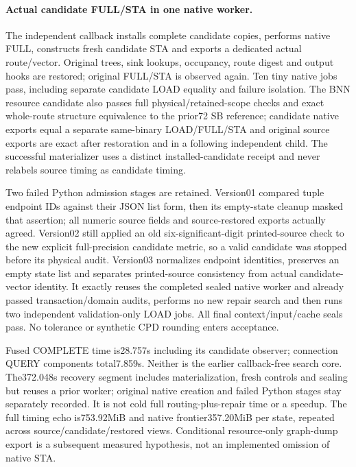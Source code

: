 \paragraph{Actual candidate FULL/STA in one native worker.}
The independent callback installs complete candidate copies, performs native FULL, constructs fresh candidate STA and exports a dedicated actual route/vector. Original trees, sink lookups, occupancy, route digest and output hooks are restored; original FULL/STA is observed again. Ten tiny native jobs pass, including separate candidate LOAD equality and failure isolation. The BNN resource candidate also passes full physical/retained-scope checks and exact whole-route structure equivalence to the prior72 SB reference; candidate native exports equal a separate same-binary LOAD/FULL/STA and original source exports are exact after restoration and in a following independent child. The successful materializer uses a distinct installed-candidate receipt and never relabels source timing as candidate timing.

Two failed Python admission stages are retained. Version01 compared tuple endpoint IDs against their JSON list form, then its empty-state cleanup masked that assertion; all numeric source fields and source-restored exports actually agreed. Version02 still applied an old six-significant-digit printed-source check to the new explicit full-precision candidate metric, so a valid candidate was stopped before its physical audit. Version03 normalizes endpoint identities, preserves an empty state list and separates printed-source consistency from actual candidate-vector identity. It exactly reuses the completed sealed native worker and already passed transaction/domain audits, performs no new repair search and then runs two independent validation-only LOAD jobs. All final context/input/cache seals pass. No tolerance or synthetic CPD rounding enters acceptance.

Fused COMPLETE time is28.757s including its candidate observer; connection QUERY components total7.859s. Neither is the earlier callback-free search core. The372.048s recovery segment includes materialization, fresh controls and sealing but reuses a prior worker; original native creation and failed Python stages stay separately recorded. It is not cold full routing-plus-repair time or a speedup. The full timing echo is753.92MiB and native frontier357.20MiB per state, repeated across source/candidate/restored views. Conditional resource-only graph-dump export is a subsequent measured hypothesis, not an implemented omission of native STA.

